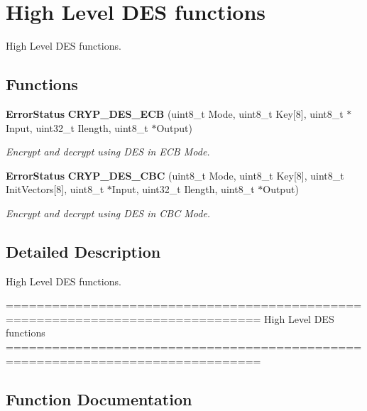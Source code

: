 \section{High Level D\+ES functions}
\label{group__CRYP__Group8}


High Level D\+ES functions.  


\subsection*{Functions}
\begin{DoxyCompactItemize}
\item 
\textbf{ Error\+Status} \textbf{ C\+R\+Y\+P\+\_\+\+D\+E\+S\+\_\+\+E\+CB} (uint8\+\_\+t Mode, uint8\+\_\+t Key[8], uint8\+\_\+t $\ast$Input, uint32\+\_\+t Ilength, uint8\+\_\+t $\ast$Output)
\begin{DoxyCompactList}\small\item\em Encrypt and decrypt using D\+ES in E\+CB Mode. \end{DoxyCompactList}\item 
\textbf{ Error\+Status} \textbf{ C\+R\+Y\+P\+\_\+\+D\+E\+S\+\_\+\+C\+BC} (uint8\+\_\+t Mode, uint8\+\_\+t Key[8], uint8\+\_\+t Init\+Vectors[8], uint8\+\_\+t $\ast$Input, uint32\+\_\+t Ilength, uint8\+\_\+t $\ast$Output)
\begin{DoxyCompactList}\small\item\em Encrypt and decrypt using D\+ES in C\+BC Mode. \end{DoxyCompactList}\end{DoxyCompactItemize}


\subsection{Detailed Description}
High Level D\+ES functions. 

\begin{DoxyVerb} ===============================================================================
                          High Level DES functions
 ===============================================================================
\end{DoxyVerb}
 

\subsection{Function Documentation}
\mbox{\label{group__CRYP__Group8_ga75724391a8560c557e1152b805f5cad1}} 
